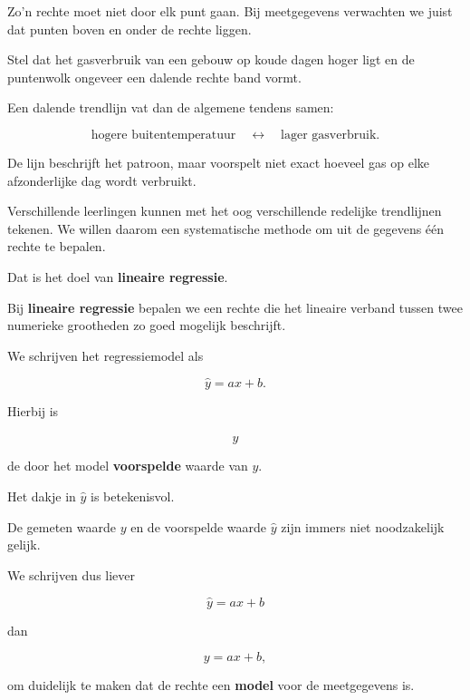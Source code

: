 \documentclass{ximera}
\begin{document}
Zo'n rechte moet niet door elk punt gaan. Bij meetgegevens verwachten
we juist dat punten boven en onder de rechte liggen.

\begin{voorbeeld}
Stel dat het gasverbruik van een gebouw op koude dagen hoger ligt en
de puntenwolk ongeveer een dalende rechte band vormt.

Een dalende trendlijn vat dan de algemene tendens samen:

\[
\text{hogere buitentemperatuur}
\quad\longleftrightarrow\quad
\text{lager gasverbruik}.
\]

De lijn beschrijft het patroon, maar voorspelt niet exact hoeveel gas
op elke afzonderlijke dag wordt verbruikt.
\end{voorbeeld}



Verschillende leerlingen kunnen met het oog verschillende redelijke
trendlijnen tekenen. We willen daarom een systematische methode om uit
de gegevens één rechte te bepalen.

Dat is het doel van \textbf{lineaire regressie}.

\begin{definitie}
Bij \textbf{lineaire regressie} bepalen we een rechte die het lineaire
verband tussen twee numerieke grootheden zo goed mogelijk beschrijft.

We schrijven het regressiemodel als

\[
\boxed{\hat y=ax+b}.
\]

Hierbij is

\[
\hat y
\]

de door het model \textbf{voorspelde} waarde van $y$.
\end{definitie}

Het dakje in $\hat y$ is betekenisvol.

De gemeten waarde $y$ en de voorspelde waarde $\hat y$ zijn immers niet
noodzakelijk gelijk.

\begin{opmerking}
We schrijven dus liever

\[
\hat y=ax+b
\]

dan

\[
y=ax+b,
\]

om duidelijk te maken dat de rechte een \textbf{model} voor de
meetgegevens is.
\end{opmerking}
\end{document}
